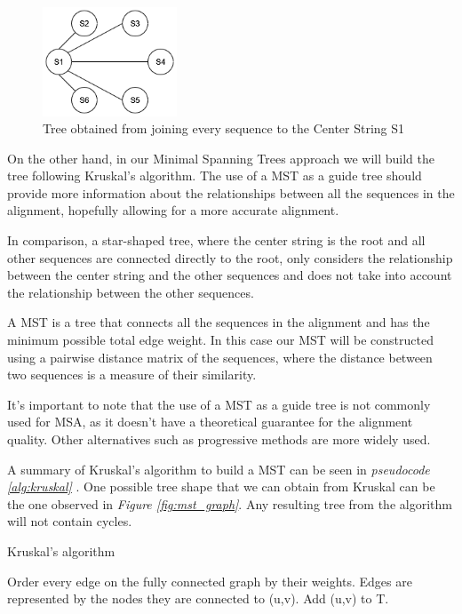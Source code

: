 \documentclass[twoside,openright,titlepage,numbers=noenddot,headinclude,%
                footinclude=true,cleardoublepage=empty,abstractoff, %
                BCOR=5mm,paper=a4,fontsize=11pt,%
                ngerman,american,%
                ]{scrreprt}
\begin{document}
\begin{figure}[h]
\includegraphics[width=4cm]{gusfields.png}
\centering
\caption{Tree obtained from joining every sequence to the Center String S1}
\label{fig:center_string}
\end{figure}

On the other hand, in our Minimal Spanning Trees approach we will build the tree following Kruskal's algorithm. The use of a MST as a guide tree should provide more information about the relationships between all the sequences in the alignment, hopefully allowing for a more accurate alignment. 

In comparison, a star-shaped tree, where the center string is the root and all other sequences are connected directly to the root, only considers the relationship between the center string and the other sequences and does not take into account the relationship between the other sequences. 

A MST is a tree that connects all the sequences in the alignment and has the minimum possible total edge weight. In this case our MST will be constructed using a pairwise distance matrix of the sequences, where the distance between two sequences is a measure of their similarity.

It's important to note that the use of a MST as a guide tree is not commonly used for MSA, as it doesn't have a theoretical guarantee for the alignment quality. Other alternatives such as progressive methods are more widely used.

A summary of Kruskal's algorithm to build a MST can be seen in \textit{pseudocode \ref{alg:kruskal}} \cite{cormen2022introduction}. One possible tree shape that we can obtain from Kruskal can be the one observed in \textit{Figure \ref{fig:mst_graph}}. Any resulting tree from the algorithm will not contain cycles.

\begin{algorithm}
	\caption{Kruskal's algorithm} 
    \label{alg:kruskal}
	\begin{algorithmic}[1]
        \State Order every edge on the fully connected graph by their weights.
        \State Edges are represented by the nodes they are connected to (u,v).
		          \State Add (u,v) to T.
		      \EndIf
		\EndFor
	\end{algorithmic} 
\end{algorithm}
\end{document}
